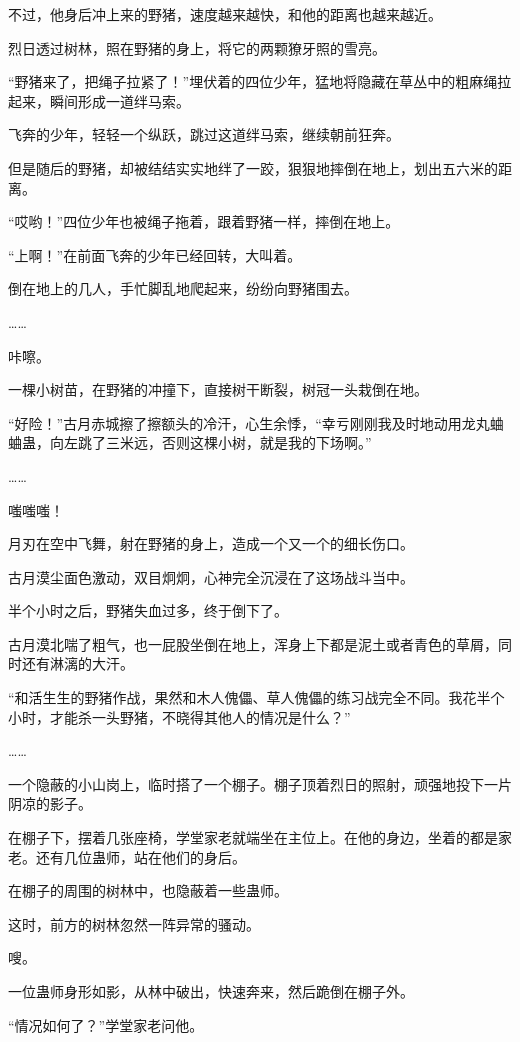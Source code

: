 \begin{this_body}
不过，他身后冲上来的野猪，速度越来越快，和他的距离也越来越近。

烈日透过树林，照在野猪的身上，将它的两颗獠牙照的雪亮。

“野猪来了，把绳子拉紧了！”埋伏着的四位少年，猛地将隐藏在草丛中的粗麻绳拉起来，瞬间形成一道绊马索。

飞奔的少年，轻轻一个纵跃，跳过这道绊马索，继续朝前狂奔。

但是随后的野猪，却被结结实实地绊了一跤，狠狠地摔倒在地上，划出五六米的距离。

“哎哟！”四位少年也被绳子拖着，跟着野猪一样，摔倒在地上。

“上啊！”在前面飞奔的少年已经回转，大叫着。

倒在地上的几人，手忙脚乱地爬起来，纷纷向野猪围去。

……

咔嚓。

一棵小树苗，在野猪的冲撞下，直接树干断裂，树冠一头栽倒在地。

“好险！”古月赤城擦了擦额头的冷汗，心生余悸，“幸亏刚刚我及时地动用龙丸蛐蛐蛊，向左跳了三米远，否则这棵小树，就是我的下场啊。”

……

嗤嗤嗤！

月刃在空中飞舞，射在野猪的身上，造成一个又一个的细长伤口。

古月漠尘面色激动，双目炯炯，心神完全沉浸在了这场战斗当中。

半个小时之后，野猪失血过多，终于倒下了。

古月漠北喘了粗气，也一屁股坐倒在地上，浑身上下都是泥土或者青色的草屑，同时还有淋漓的大汗。

“和活生生的野猪作战，果然和木人傀儡、草人傀儡的练习战完全不同。我花半个小时，才能杀一头野猪，不晓得其他人的情况是什么？”

……

一个隐蔽的小山岗上，临时搭了一个棚子。棚子顶着烈日的照射，顽强地投下一片阴凉的影子。

在棚子下，摆着几张座椅，学堂家老就端坐在主位上。在他的身边，坐着的都是家老。还有几位蛊师，站在他们的身后。

在棚子的周围的树林中，也隐蔽着一些蛊师。

这时，前方的树林忽然一阵异常的骚动。

嗖。

一位蛊师身形如影，从林中破出，快速奔来，然后跪倒在棚子外。

“情况如何了？”学堂家老问他。


\end{this_body}
